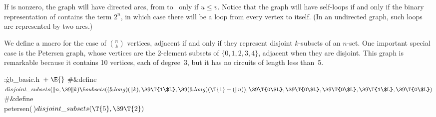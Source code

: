 If  is nonzero, the graph will have directed arcs, from 
to~ only if $u\le v$. Notice that the graph will have self-loops if
and only if the binary representation of  contains the term
$2^n$, in which case there will be a loop from every vertex to itself.
(In an undirected graph, such loops are represented by two arcs.)

We define a macro  for the case
of $n\choose k$ vertices, adjacent if and only if they represent
disjoint $k$-subsets of an $n$-set.
One important special case is the Petersen graph, whose vertices
are the 2-element subsets of $\{0,1,2,3,4\}$, adjacent when they
are disjoint. This graph is remarkable because it contains 10 vertices,
each of degree~3, but it has no circuits of length less than~5.

\Y\B\4:\.{gb\_basic.h\,}\X${}\mathrel+\E{}$\6
\8\#\&{define} ${}\\{disjoint\_subsets}(\|n,\39\|k)\5\\{subsets}((\&{long})(%
\|k),\39\T{1\$L},\39(\&{long})(\T{1}-(\|n)),\39\T{0\$L},\39\T{0\$L},\39\T{0%
\$L},\39\T{1\$L},\39\T{0\$L}){}$\6
\8\#\&{define} \\{petersen}(\,)\5${}\\{disjoint\_subsets}(\T{5},\39\T{2}){}$\par
\fi

